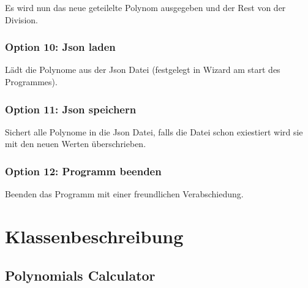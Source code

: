 \documentclass[letterpaper,10pt,ngerman]{sphinxmanual}
\begin{document}
Es wird nun das neue geteilelte Polynom ausgegeben und der Rest von der Division.



\subsection{Option 10: Json laden}
\label{menu:option-10-json-laden}
Lädt die Polynome aus der Json Datei (festgelegt in Wizard am start des Programmes).



\subsection{Option 11: Json speichern}
\label{menu:option-11-json-speichern}
Sichert alle Polynome in die Json Datei, falls die Datei schon exiestiert wird sie mit den neuen Werten überschrieben.



\subsection{Option 12: Programm beenden}
\label{menu:option-12-programm-beenden}
Beenden das Programm mit einer freundlichen Verabschiedung.



\chapter{Klassenbeschreibung}
\label{index:klassenbeschreibung}

\section{Polynomials Calculator}
\label{packages:polynomials-calculator}\label{packages::doc}
\end{document}
